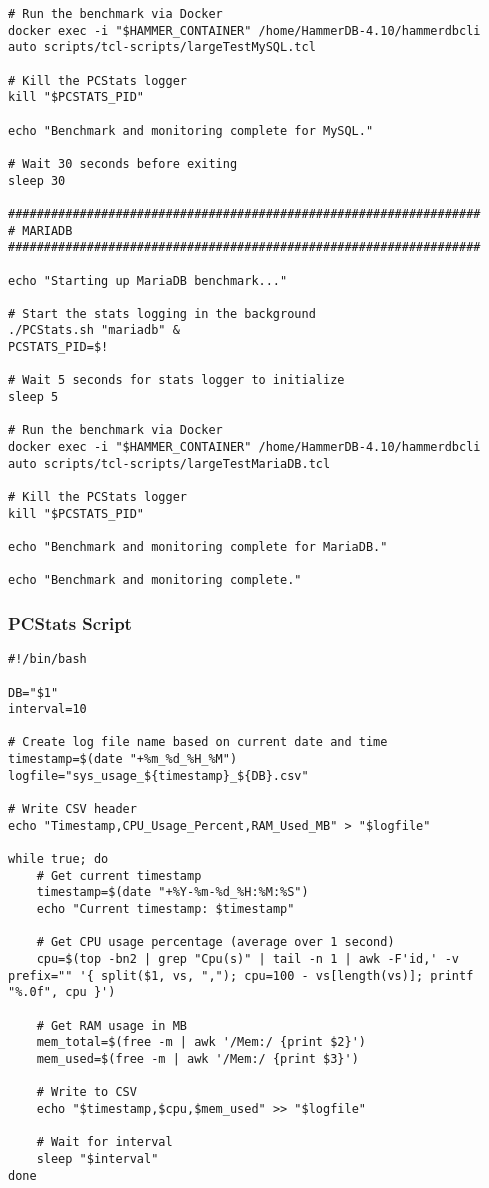\begin{lstlisting}[caption={Shell script to run the TCL scripts}, label={lst:shell-script}]
# Run the benchmark via Docker
docker exec -i "$HAMMER_CONTAINER" /home/HammerDB-4.10/hammerdbcli auto scripts/tcl-scripts/largeTestMySQL.tcl

# Kill the PCStats logger
kill "$PCSTATS_PID"

echo "Benchmark and monitoring complete for MySQL."

# Wait 30 seconds before exiting
sleep 30

##################################################################
# MARIADB
##################################################################

echo "Starting up MariaDB benchmark..."

# Start the stats logging in the background
./PCStats.sh "mariadb" &
PCSTATS_PID=$!

# Wait 5 seconds for stats logger to initialize
sleep 5

# Run the benchmark via Docker
docker exec -i "$HAMMER_CONTAINER" /home/HammerDB-4.10/hammerdbcli auto scripts/tcl-scripts/largeTestMariaDB.tcl

# Kill the PCStats logger
kill "$PCSTATS_PID"

echo "Benchmark and monitoring complete for MariaDB."

echo "Benchmark and monitoring complete."
\end{lstlisting}

\subsubsection{PCStats Script}
\label{sec:pcstats-script-shell}

\begin{lstlisting}[caption={PCStats script to monitor the system in Linux}, label={lst:pcstats-script-shell}]
#!/bin/bash

DB="$1"
interval=10

# Create log file name based on current date and time
timestamp=$(date "+%m_%d_%H_%M")
logfile="sys_usage_${timestamp}_${DB}.csv"

# Write CSV header
echo "Timestamp,CPU_Usage_Percent,RAM_Used_MB" > "$logfile"

while true; do
    # Get current timestamp
    timestamp=$(date "+%Y-%m-%d_%H:%M:%S")
    echo "Current timestamp: $timestamp"

    # Get CPU usage percentage (average over 1 second)
    cpu=$(top -bn2 | grep "Cpu(s)" | tail -n 1 | awk -F'id,' -v prefix="" '{ split($1, vs, ","); cpu=100 - vs[length(vs)]; printf "%.0f", cpu }')

    # Get RAM usage in MB
    mem_total=$(free -m | awk '/Mem:/ {print $2}')
    mem_used=$(free -m | awk '/Mem:/ {print $3}')

    # Write to CSV
    echo "$timestamp,$cpu,$mem_used" >> "$logfile"

    # Wait for interval
    sleep "$interval"
done
\end{lstlisting}

